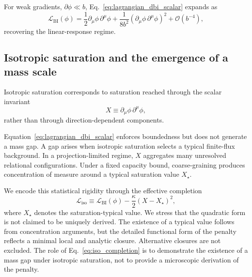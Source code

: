 \documentclass[pdflatex,sn-mathphys-num]{sn-jnl} %
\theoremstyle{remark}
\begin{document}
  For weak gradients, $\partial\phi \ll b$, Eq.~\eqref{eq:lagrangian_dbi_scalar} expands as
  \begin{equation}
    \mathcal{L}_{\mathrm{BI}}(\phi)
    = \frac{1}{2}\partial_{\mu}\phi \, \partial^{\mu}\phi
    + \frac{1}{8b^2}
    \left(\partial_{\mu}\phi \, \partial^{\mu}\phi\right)^2
    + \mathcal{O}\!\left(b^{-4}\right),
    \label{eq:dbi_expansion}
  \end{equation}
  recovering the linear-response regime.

  \subsection{Isotropic saturation and the emergence of a mass scale}
  \label{subsec:isotropic_mass}

  Isotropic saturation corresponds to saturation reached through the scalar invariant
  \begin{equation}
    X \equiv \partial_{\mu}\phi \, \partial^{\mu}\phi,
    \label{eq:kinetic_invariant}
  \end{equation}
  rather than through direction-dependent components.

  Equation~\eqref{eq:lagrangian_dbi_scalar} enforces boundedness but does not generate a mass
  gap.
  A gap arises when isotropic saturation selects a typical finite-flux background.
  In a projection-limited regime, $X$ aggregates many unresolved relational configurations.
  Under a fixed capacity bound, coarse-graining produces concentration of measure around a
  typical saturation value $X_{\star}$.

  We encode this statistical rigidity through the effective completion
  \begin{equation}
    \mathcal{L}_{\mathrm{iso}}
    \equiv \mathcal{L}_{\mathrm{BI}}(\phi)
    - \frac{\kappa}{2}\left(X-X_{\star}\right)^2,
    \label{eq:iso_completion}
  \end{equation}
  where $X_{\star}$ denotes the saturation-typical value.
  We stress that the quadratic form is not claimed to be uniquely derived.
  The existence of a typical value follows from concentration arguments, but the detailed
  functional form of the penalty reflects a minimal local and analytic closure.
  Alternative closures are not excluded.
  The role of Eq.~\eqref{eq:iso_completion} is to demonstrate the existence of a mass gap
  under isotropic saturation, not to provide a microscopic derivation of the penalty.
\end{document}
